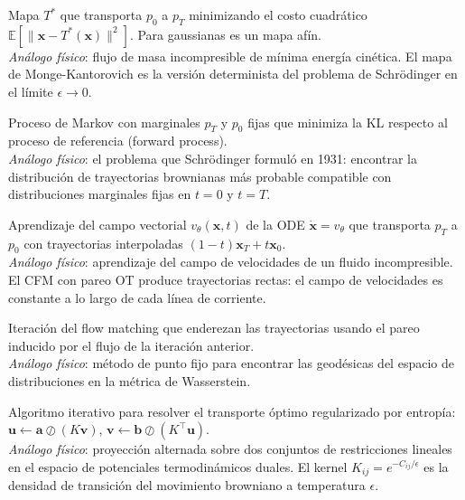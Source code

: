 \begin{description}[leftmargin=0pt, labelwidth=!, labelsep=1em,
  font=\normalfont\bfseries, style=nextline]

\item[OT --- \textit{Optimal Transport}]
Mapa $T^*$ que transporta $p_0$ a $p_T$ minimizando el costo cuadrático
$\mathbb{E}[\|\bm{x} - T^*(\bm{x})\|^2]$. Para gaussianas es un mapa
afín.\\
\emph{Análogo físico}: flujo de masa incompresible de mínima energía
cinética. El mapa de Monge-Kantorovich es la versión determinista del
problema de Schrödinger en el límite $\epsilon\to 0$.

\item[Puente de Schrödinger]
Proceso de Markov con marginales $p_T$ y $p_0$ fijas que minimiza la KL
respecto al proceso de referencia (forward process).\\
\emph{Análogo físico}: el problema que Schrödinger formuló en 1931:
encontrar la distribución de trayectorias brownianas más probable
compatible con distribuciones marginales fijas en $t=0$ y $t=T$.

\item[FM / CFM --- \textit{(Conditional) Flow Matching}]
Aprendizaje del campo vectorial $v_\theta(\bm{x},t)$ de la ODE
$\dot{\bm{x}} = v_\theta$ que transporta $p_T$ a $p_0$ con trayectorias
interpoladas $(1-t)\bm{x}_T + t\bm{x}_0$.\\
\emph{Análogo físico}: aprendizaje del campo de velocidades de un fluido
incompresible. El CFM con pareo OT produce trayectorias rectas: el
campo de velocidades es constante a lo largo de cada línea de corriente.

\item[Rectified flow]
Iteración del flow matching que enderezan las trayectorias usando el pareo
inducido por el flujo de la iteración anterior.\\
\emph{Análogo físico}: método de punto fijo para encontrar las geodésicas
del espacio de distribuciones en la métrica de Wasserstein.

\item[Sinkhorn]
Algoritmo iterativo para resolver el transporte óptimo regularizado por
entropía: $\bm{u} \leftarrow \bm{a}\oslash(K\bm{v})$,
$\bm{v}\leftarrow\bm{b}\oslash(K^\top\bm{u})$.\\
\emph{Análogo físico}: proyección alternada sobre dos conjuntos de
restricciones lineales en el espacio de potenciales termodinámicos
duales. El kernel $K_{ij} = e^{-C_{ij}/\epsilon}$ es la densidad de
transición del movimiento browniano a temperatura $\epsilon$.

\end{description}

